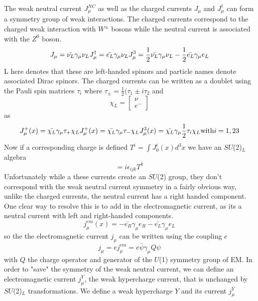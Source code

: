 The weak neutral current $J_\mu^{NC}$ as well as the charged currents $J_\mu$ and $J_\mu^\dagger$ can form a symmetry group of weak interactions. The charged currents correspond to the charged weak interaction with $W^\pm$ bosons while the neutral current is associated with the $Z^0$ boson.
\begin{equation}
J_\mu=\bar{\nu_L}\gamma_\mu\nu_L \\
J_\mu^\dagger =\bar{e_L}\gamma_\mu\nu_L
J_\mu^3=\frac{1}{2}\bar{\nu_L}\gamma_\mu\nu_L-\frac{1}{2}\bar{e_L}\gamma_\mu e_L
\end{equation}
L here denotes that these are left-handed spinors and particle names denote associated Dirac spinors. The charged currents can be written as a doublet using the Pauli spin matrices $\tau_i$ where $\tau_\pm=\frac{1}{2}(\tau_1\pm i\tau_2$ and
\begin{equation}
\chi_L=\begin{bmatrix}
        \nu  \\
        e^-
        \end{bmatrix}
\end{equation}
as 
\begin{equation}
J_\mu^+(x)=\bar{\chi_L}\gamma_\mu\tau_+\chi_L \\
J_\mu^+(x)=\bar{\chi_L}\gamma_\mu\tau_-\chi_L \\
J_\mu^3(x)=\bar{\chi_L}\gamma_\mu\frac{1}{2}\tau_i\chi_L \textnormal{with} i=1,23
\end{equation}
Now if a corresponding charge is defined $T^i=\int J_0^i(x)d^3x$ we have an $SU$(2)$_L$ algebra
\begin{equation}
[T^i,T^j]=i\epsilon_{ijk}T^k
\end{equation}
Unfortunately while a these currents create an $SU$(2) group, they don't correspond with the weak neutral current symmetry in a fairly obvious way, unlike the charged currents, the neutral current has a right handed component. One clear way to resolve this is to add in the electromagnetic current, as its a neutral current with left and right-handed components.
\begin{equation} 
j_\mu^{em}(x)=-\bar{e_R}\gamma_\mu e_R-\bar{e_L}\gamma_\mu e_L
\end{equation}
so the the electromagnetic current $j_\mu$ can be written using the coupling $e$
\begin{equation}
j_\mu=e j_\mu^{em} = e\bar{\psi}\gamma_\mu Q\psi
\end{equation}
with $Q$ the charge operator and generator of the $U$(1) symmetry group of EM. In order to "save" the symmetry of the weak neutral current, we can define an electromagnetic current $j_\mu^Y$, the weak hypercharge current, that is unchanged by $SU$(2)$_L$ transformations. We define a weak hypercharge $Y$ and its current $j_\mu^Y$
